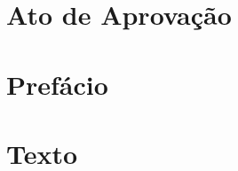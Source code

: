 \documentclass[msc]{ita}
\begin{document}
\maketitle


\tableofcontents

\mainmatter
 
\chapter{Ato de Aprovação} 


\chapter{Prefácio} 


\chapter{Texto} 


\renewcommand\bibname{\itareferencesnamebabel} 

\end{document}
